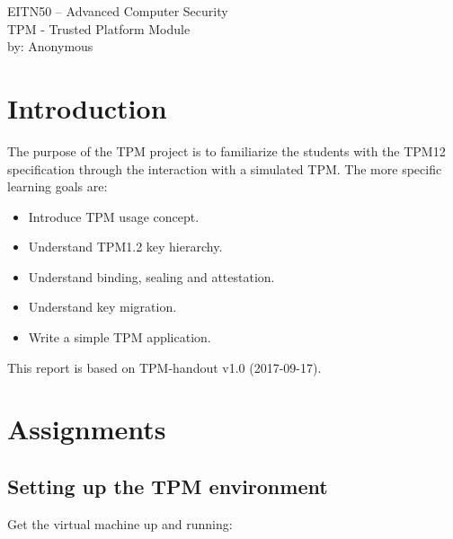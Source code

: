 \documentclass[10pt]{article}
\begin{document}

  \thispagestyle{empty}
  \vspace*{3cm}
  \begin{center}
    \huge{EITN50 -- Advanced Computer Security} \\
    \vspace{0.3cm}
    \LARGE{TPM - Trusted Platform Module} \\
    \vspace{1cm}
    \large{by: Anonymous} \\
  \end{center}


  \newpage

  \section*{Introduction}

    The purpose of the TPM project is to familiarize the students with the
    TPM12 specification through the interaction with a simulated TPM. The more
    specific learning goals are:

    \begin{itemize}
      \item{Introduce TPM usage concept.}
      \item{Understand TPM1.2 key hierarchy.}
      \item{Understand binding, sealing and attestation.}
      \item{Understand key migration.}
      \item{Write a simple TPM application.}
    \end{itemize}

    This report is based on TPM-handout v1.0 (2017-09-17).

  \setcounter{section}{2}

  \section{Assignments}

    \subsection{Setting up the TPM environment}

      Get the virtual machine up and running:
\end{document}
